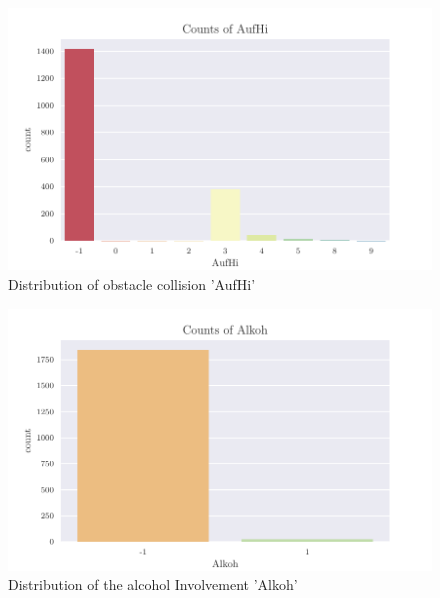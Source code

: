 \documentclass[a4paper,headsepline,footsepline,fontsize=11pt,BCOR=12mm,DIV=12]{report}
\begin{document}
\begin{appendices}
\begin{figure}[h]
	\centering
	\includegraphics[scale=1]{../CorrAnalysis/data/BAYSIS/02_matched/plots/baysis_matched_count_Aufhi}
	\caption{Distribution of obstacle collision 'AufHi'}
	\label{img:appendix_baysis_matched_Aufhi}
\end{figure}

\begin{figure}[h]
	\centering
	\includegraphics[scale=1]{../CorrAnalysis/data/BAYSIS/02_matched/plots/baysis_matched_count_Alkoh}
	\caption{Distribution of the alcohol Involvement 'Alkoh'}
	\label{img:appendix_baysis_matched_Alkoh}
\end{figure}


\end{appendices}
\end{document}
